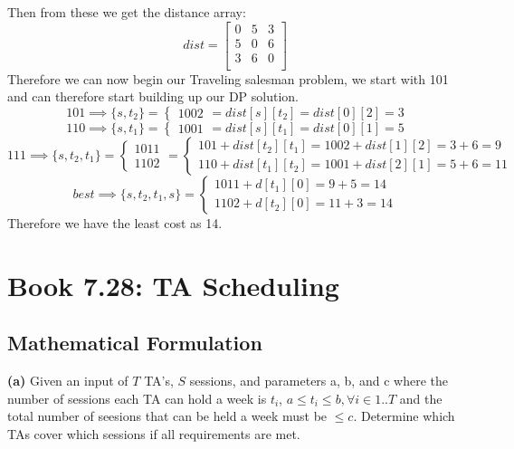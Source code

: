 \documentclass[12pt]{article}
\begin{document}
Then from these we get the distance array:
\[
dist =
\begin{bmatrix}
0 & 5 & 3 \\
5 & 0 & 6 \\
3 & 6 & 0 \\
\end{bmatrix}
\]
Therefore we can now begin our Traveling salesman problem, we start with 101 and can therefore
start building up our DP solution.
\[
101 \implies \{s,t_2\} =
\begin{cases}
1002
\end{cases}
= dist[s][t_2] = dist[0][2] = 3
\]
\[
110 \implies \{s,t_1\} =
\begin{cases}
1001
\end{cases}
= dist[s][t_1] = dist[0][1] = 5
\]
\[
111 \implies \{s,t_2,t_1\} =
\begin{cases}
1011 \\
1102
\end{cases}
=
\begin{cases}
101 + dist[t_2][t_1] = 1002 + dist[1][2] = 3 + 6 = 9 \\
110 + dist[t_1][t_2] = 1001 + dist[2][1] = 5 + 6 = 11
\end{cases}
\]
\[
best \implies \{s,t_2,t_1,s\} =
\begin{cases}
1011 + d[t_1][0] = 9  + 5 = 14\\
1102 + d[t_2][0] = 11 + 3 = 14
\end{cases}
\]
Therefore we have the least cost as 14.

\newpage

\section{Book 7.28: TA Scheduling}

\subsection{Mathematical Formulation}
\textbf{(a)} Given an input of $T$ TA's, $S$ sessions, and parameters a, b, and c where the number of sessions each TA
can hold a week is $t_i$, $a \leq t_i \leq b, \forall i \in 1..T$ and the total number of seesions that can
be held a week must be $\leq c$. Determine which TAs cover which sessions if all requirements are met. \\
\end{document}

